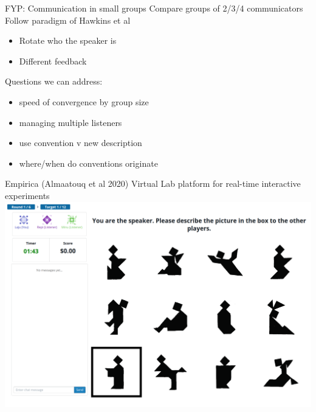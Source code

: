 \documentclass[ 12pt, xcolor=beamer,table,usenames,dvipsnames, ignorenonframetext, ngerman]{beamer}
\begin{document}
\begin{frame}{\large FYP: Communication in small groups}
	Compare groups of 2/3/4 communicators
	Follow paradigm of Hawkins et al
	\begin{itemize}
		\item Rotate who the speaker is
		\item Different feedback
	\end{itemize} 
Questions we can address:
\begin{itemize}
	\item speed of convergence by group size
	\item managing multiple listeners
	\item use convention v new description
	\item where/when do conventions originate
\end{itemize}

\end{frame}

\begin{frame}{\large Empirica (Almaatouq et al 2020)}
Virtual Lab platform for real-time interactive experiments
 \includegraphics[width=\textwidth]{../images/interface.PNG}
\end{frame}
\end{document}
